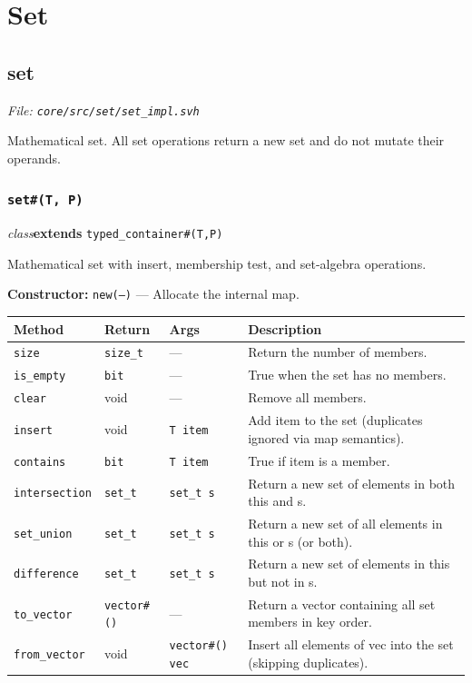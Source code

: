 \documentclass[11pt,letterpaper]{report}
\begin{document}
\chapter{Set}
\section{set}
\noindent\small\textit{File: \texttt{core/src/set/set\_impl.svh}}\par

Mathematical set. All set operations return a new set and do not mutate their operands.

\subsection*{\texttt{set\#(T, P)}}
\noindent\small\textit{class}\quad \textbf{extends} \texttt{typed\_container\#(T,P)}\par

Mathematical set with insert, membership test, and set-algebra operations.

\noindent\textbf{Constructor:} \texttt{new(---)} --- Allocate the internal map.

\begin{xltabular}{\linewidth}{>{\small}p{1.35in} >{\small}p{1.25in} >{\small}p{0.95in} >{\small}X}
\toprule
\textbf{Method} & \textbf{Return} & \textbf{Args} & \textbf{Description} \\
\midrule
\endhead
\bottomrule
\endfoot
\texttt{size} & \texttt{size\_t} & --- & Return the number of members. \\
\texttt{is\_empty} & \texttt{bit} & --- & True when the set has no members. \\
\texttt{clear} & void & --- & Remove all members. \\
\texttt{insert} & void & \texttt{T item} & Add item to the set (duplicates ignored via map semantics). \\
\texttt{contains} & \texttt{bit} & \texttt{T item} & True if item is a member. \\
\texttt{intersection} & \texttt{set\_t} & \texttt{set\_t s} & Return a new set of elements in both this and s. \\
\texttt{set\_union} & \texttt{set\_t} & \texttt{set\_t s} & Return a new set of all elements in this or s (or both). \\
\texttt{difference} & \texttt{set\_t} & \texttt{set\_t s} & Return a new set of elements in this but not in s. \\
\texttt{to\_vector} & \texttt{vector\#()} & --- & Return a vector containing all set members in key order. \\
\texttt{from\_vector} & void & \texttt{vector\#() vec} & Insert all elements of vec into the set (skipping duplicates). \\
\end{xltabular}
\end{document}
